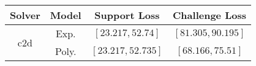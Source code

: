 \begin{tabular}{cc|c|c} 
\hline 
 Solver & Model & Support Loss  & Challenge Loss \tabularnewline\hline 
\hline 
\multirow{2}{*}{c2d} & Exp. & $\left[23.217,52.74\right]$ & $\left[81.305,90.195\right]$ \tabularnewline 
 & Poly. & $\mathbf{\left[23.217,52.735\right]}$ & $\mathbf{\left[68.166,75.51\right]}$ \tabularnewline 
\hline 
\end{tabular} 

